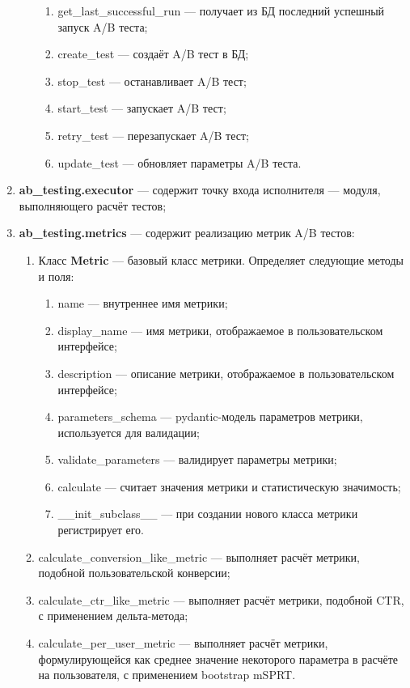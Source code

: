 \documentclass[../document.tex]{subfiles}
\begin{document}
\begin{enumerate}
\begin{enumerate}
\begin{enumerate}
				\item get\_last\_successful\_run --- получает из БД последний успешный запуск A/B теста;
				\item create\_test --- создаёт A/B тест в БД;
				\item stop\_test --- останавливает A/B тест;
				\item start\_test --- запускает A/B тест;
				\item retry\_test --- перезапускает A/B тест;
				\item update\_test --- обновляет параметры A/B теста.
			\end{enumerate}
		\end{enumerate}
		\item \textbf{ab\_testing.executor} --- содержит точку входа исполнителя --- модуля, выполняющего расчёт тестов;
		\item \textbf{ab\_testing.metrics} --- содержит реализацию метрик A/B тестов:
		\begin{enumerate}
			\item Класс \textbf{Metric} --- базовый класс метрики. Определяет следующие методы и поля:
			\begin{enumerate}
				\item name --- внутреннее имя метрики;
				\item display\_name --- имя метрики, отображаемое в пользовательском интерфейсе;
				\item description --- описание метрики, отображаемое в пользовательском интерфейсе;
				\item parameters\_schema --- pydantic-модель параметров метрики, используется для валидации;
				\item validate\_parameters --- валидирует параметры метрики;
				\item calculate --- считает значения метрики и статистическую значимость;
				\item \_\_init\_subclass\_\_ --- при создании нового класса метрики регистрирует его.
			\end{enumerate}
			\item calculate\_conversion\_like\_metric --- выполняет расчёт метрики, подобной пользовательской конверсии;
			\item calculate\_ctr\_like\_metric --- выполняет расчёт метрики, подобной CTR, с применением дельта-метода;
			\item calculate\_per\_user\_metric --- выполняет расчёт метрики, формулирующейся как среднее значение некоторого параметра в расчёте на пользователя, с применением bootstrap mSPRT.

\end{enumerate}
\end{enumerate}
\end{document}
